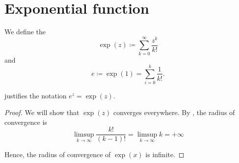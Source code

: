 \section{Exponential function}\label{sec:exponential_function}

\begin{definition}\label{def:exponential_function}
  We define the 
  \begin{equation}\label{def:exponential_function/series}
    \exp(z) \coloneqq \sum_{k=0}^\infty \frac {z^k} {k!}
  \end{equation}
  and 
  \begin{equation*}
    e \coloneqq \exp(1) = \sum_{i=0}^k \frac 1 {k!}.
  \end{equation*}

   justifies the notation \( e^z = \exp(z) \).
\end{definition}
\begin{proof}
  We will show that \( \exp(z) \) converges everywhere. By , the radius of convergence is
  \begin{equation*}
    \limsup_{k \to \infty} \frac {k!} {(k-1)!}
    =
    \limsup_{k \to \infty} k
    =
    +\infty
  \end{equation*}

  Hence, the radius of convergence of \( \exp(x) \) is infinite.
\end{proof}

